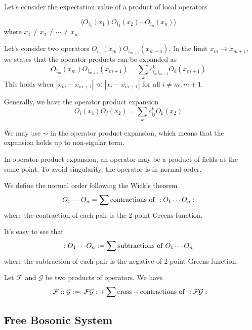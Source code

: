 \documentclass[12pt]{book}
\begin{document}
	Let's consider the expectation value of a product of local operators
	
	\begin{equation}
		\langle O_{i_1}(x_1) O_{i_2}(x_2)\cdots O_{i_n}(x_n)\rangle
	\end{equation}
	where $x_1\neq x_2\neq\cdots\neq x_n$.
	
	Let's consider two operators $O_{i_m}(x_m)O_{i_{m+1}}(x_{m+1})$. In the limit $x_m\rightarrow x_{m+1}$, we states that the operator products can be expanded as
	\begin{equation}
		O_{i_m}(x_m)O_{i_{m+1}}(x_{m+1})=\sum_k c_{i_mi_{m+1}}^k O_k(x_{m+1})
	\end{equation}
	This holds when $|x_m-x_{m+1}|\ll |x_i-x_{m+1}|$ for all $i\neq m,m+1$.
	
	Generally, we have the operator product expansion
	\begin{equation}
		O_i(x_1)O_j(x_2)=\sum_k c_{ij}^k O_k(x_2)
	\end{equation}
	
	We may use $\sim$ in the operator product expansion, which means that the expansion holds up to non-sigular term.
	
	In operator product expansion, an operator may be a product of fields at the same point. To avoid singularity, the operator is in normal order.
	
	We define the normal order following the Wick's theorem
	\begin{equation}
		O_1\cdots O_n=\sum{\rm contractions \ of\ } :O_1\cdots O_n:
	\end{equation}
	where the contraction of each pair is the 2-point Greens function.
	
	It's easy to see that 
	\begin{equation}
		:O_1\cdots O_n:=\sum{\rm subtractions \ of\ } O_1\cdots O_n
	\end{equation}
	where the subtraction of each pair is the negative of 2-point Greens function.
	
	Let $\mathcal F$ and $\mathcal G$ be two products of operators. We have
	\begin{equation}
		:\mathcal F::\mathcal G:=:\mathcal F\mathcal G:+\sum{\rm cross-contractions\ of\ } :\mathcal F\mathcal G:
	\end{equation}
	\subsection{Free Bosonic System}
		
\end{document}

